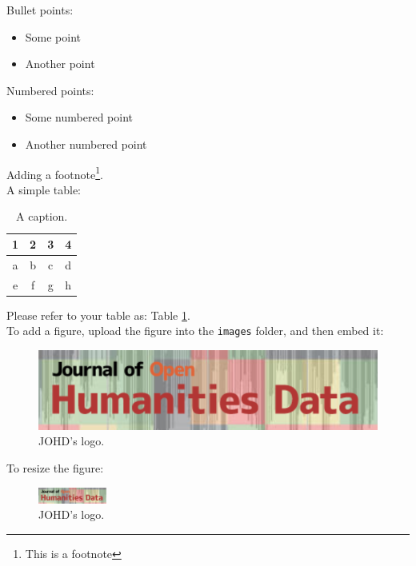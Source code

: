 \documentclass{article}
\begin{document}
\noindent Bullet points:
\begin{itemize}
    \item Some point
    \item Another point
\end{itemize}

\noindent Numbered points:
\begin{itemize}
    \item[1.] Some numbered point 
    \item[2.] Another numbered point
\end{itemize}

\noindent Adding a footnote\footnote{This is a footnote}. \\

\noindent A simple table:

\begin{table}[H]
\centering
\caption{\label{tab1} A caption.} %
\begin{tabular}{cccc}
\hline
1 & 2 & 3 & 4 \\
\hline
a & b & c & d\\
e & f & g & h\\
\hline
\end{tabular}
\end{table}

\noindent Please refer to your table as: Table \ref{tab1}. \\

\noindent To add a figure, upload the figure into the \texttt{images} folder, and then embed it:

\begin{figure}[H]
\centering
\includegraphics{images/image.jpg}
\caption{\label{fig1}JOHD's logo.}
\end{figure}

\noindent To resize the figure:

\begin{figure}[H]
\centering
\includegraphics[width=0.2\textwidth]{images/image.jpg}
\caption{\label{fig2}JOHD's logo.}
\end{figure}
\end{document}

